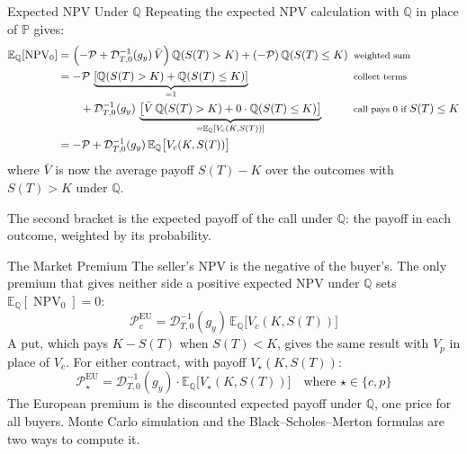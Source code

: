 \documentclass[aspectratio=169,11pt]{beamer}
\newcommand{\E}{\mathbb{E}}
\newcommand{\Q}{\mathbb{Q}}
\newcommand{\Dinv}{\mathcal{D}^{-1}_{T,0}(g_{y})}
\newcommand{\ST}{S(T)}
\begin{document}
\begin{frame}{Expected NPV Under \texorpdfstring{$\Q$}{Q}}
  Repeating the expected NPV calculation with $\Q$ in place of $\mathbb{P}$
  gives:
  {\small
  \[
    \begin{alignedat}{2}
      \E_{\Q}[\operatorname{NPV}_0]&=\left(-\mathcal{P}+\Dinv\,\bar{V}\right)\Q(\ST>K)+(-\mathcal{P})\,\Q(\ST\le K) &\enspace&\text{\footnotesize weighted sum}\\
      &=-\mathcal{P}\,\underbrace{\left[\Q(\ST>K)+\Q(\ST\le K)\right]}_{=1} &&\text{\footnotesize collect terms}\\
      &\qquad+\Dinv\,\underbrace{\left[\bar{V}\,\Q(\ST>K)+0\cdot\Q(\ST\le K)\right]}_{=\E_{\Q}[V_{c}(K,\ST)]} &&\text{\footnotesize call pays 0 if }\ST\le K\\
      &=-\mathcal{P}+\Dinv\,\E_{\Q}\bigl[V_{c}(K,\ST)\bigr]
    \end{alignedat}
  \]
  }%
  where $\bar{V}$ is now the average payoff $\ST-K$ over the outcomes with
  $\ST>K$ under $\Q$.

  \vspace{0.5em}
  The second bracket is the expected payoff of the call under $\Q$: the payoff
  in each outcome, weighted by its probability.
\end{frame}

\begin{frame}{The Market Premium}
  The seller's NPV is the negative of the buyer's. The only premium that gives
  neither side a positive expected NPV under $\Q$ sets
  $\E_{\Q}[\operatorname{NPV}_0]=0$:
  \[
    \boxed{\mathcal{P}^{\text{EU}}_{c}=\Dinv\,\E_{\Q}\bigl[V_{c}(K,\ST)\bigr]}
  \]
  A put, which pays $K-\ST$ when $\ST<K$, gives the same result with $V_{p}$ in
  place of $V_{c}$. For either contract, with payoff $V_{\star}(K,\ST)$:
  \[
    \boxed{\mathcal{P}_{\star}^{\text{EU}}=\Dinv\cdot\E_{\Q}\bigl[V_{\star}(K,\ST)\bigr]\quad\text{where }\star\in\{c,p\}}
  \]
  The European premium is the discounted expected payoff under $\Q$, one price
  for all buyers. Monte Carlo simulation and the Black--Scholes--Merton formulas
  are two ways to compute it.
\end{frame}
\end{document}
